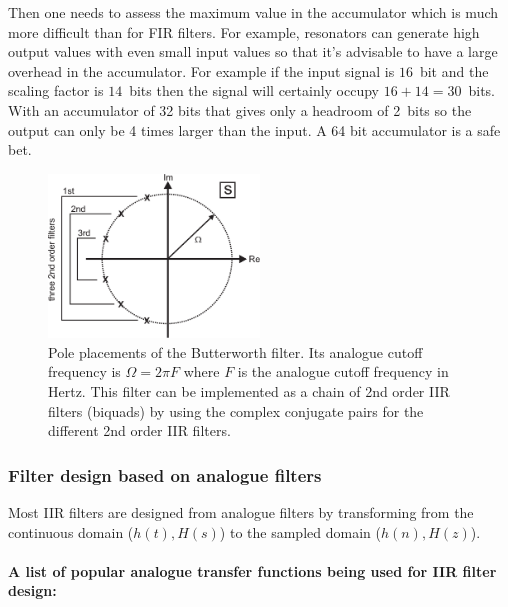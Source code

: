 \documentclass[12pt,a4paper]{article}
\begin{document}
Then one needs to assess the maximum value in the accumulator which
is much more difficult than for FIR filters. For example,
resonators can generate high output values with even small input values
so that it's advisable to have a large overhead in the accumulator.
For example if the input signal is $16$~bit and the scaling factor is
$14$~bits then the signal will certainly occupy $16+14=30$~bits. With
an accumulator of 32 bits that gives only a headroom of 2~bits so the
output can only be 4 times larger than the input. A 64 bit accumulator
is a safe bet.

\begin{figure}[!hbt]
\begin{center}
\mbox{\includegraphics[width=0.5\textwidth]{butterworth_poles}}
\end{center}
\caption{Pole placements of the Butterworth filter. Its analogue
  cutoff frequency is $\Omega = 2\pi F$ where $F$ is the
  analogue cutoff frequency in Hertz. This filter can be implemented
  as a chain of 2nd order IIR filters (biquads) by using the
  complex conjugate pairs for the different 2nd order IIR filters.
\label{butterworth_poles}}
\end{figure}



\subsubsection{Filter design based on analogue filters}
Most IIR filters are designed from analogue filters by transforming
from the continuous domain ($h(t),H(s)$) to the sampled domain
($h(n),H(z)$).

\paragraph{A list of popular analogue transfer functions being
used for IIR filter design:}
\end{document}
